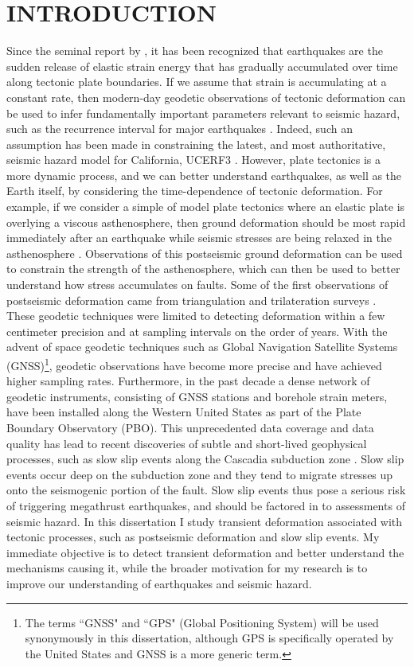 \chapter{INTRODUCTION}
Since the seminal report by \citet{Reid1910}, it has been recognized that earthquakes are the sudden release of elastic strain energy that has gradually accumulated over time along tectonic plate boundaries. If we assume that strain is accumulating at a constant rate, then modern-day geodetic observations of tectonic deformation can be used to infer fundamentally important parameters relevant to seismic hazard, such as the recurrence interval for major earthquakes \citep[e.g.,][]{Savage1973,Meade2005}. Indeed, such an assumption has been made in constraining the latest, and most authoritative, seismic hazard model for California, UCERF3 \citep{Field2014}. However, plate tectonics is a more dynamic process, and we can better understand earthquakes, as well as the Earth itself, by considering the time-dependence of tectonic deformation. For example, if we consider a simple of model plate tectonics where an elastic plate is overlying a viscous asthenosphere, then ground deformation should be most rapid immediately after an earthquake while seismic stresses are being relaxed in the asthenosphere \citep{Nur1974,Savage1978}. Observations of this postseismic ground deformation can be used to constrain the strength of the asthenosphere, which can then be used to better understand how stress accumulates on faults. Some of the first observations of postseismic deformation came from triangulation and trilateration surveys \citep[e.g,][]{Thatcher1983}. These geodetic techniques were limited to detecting deformation within a few centimeter precision and at sampling intervals on the order of years. With the advent of space geodetic techniques such as Global Navigation Satellite Systems (GNSS)\footnote{The terms ``GNSS" and ``GPS" (Global Positioning System) will be used synonymously in this dissertation, although GPS is specifically operated by the United States and GNSS is a more generic term.}, geodetic observations have become more precise and have achieved higher sampling rates. Furthermore, in the past decade a dense network of geodetic instruments, consisting of GNSS stations and borehole strain meters, have been installed along the Western United States as part of the Plate Boundary Observatory (PBO). This unprecedented data coverage and data quality has lead to recent discoveries of subtle and short-lived geophysical processes, such as slow slip events along the Cascadia subduction zone \citep{Dragert2001}. Slow slip events occur deep on the subduction zone and they tend to migrate stresses up onto the seismogenic portion of the fault. Slow slip events thus pose a serious risk of triggering megathrust earthquakes, and should be factored in to assessments of seismic hazard. In this dissertation I study transient deformation associated with tectonic processes, such as postseismic deformation and slow slip events. My immediate objective is to detect transient deformation and better understand the mechanisms causing it, while the broader motivation for my research is to improve our understanding of earthquakes and seismic hazard.        

